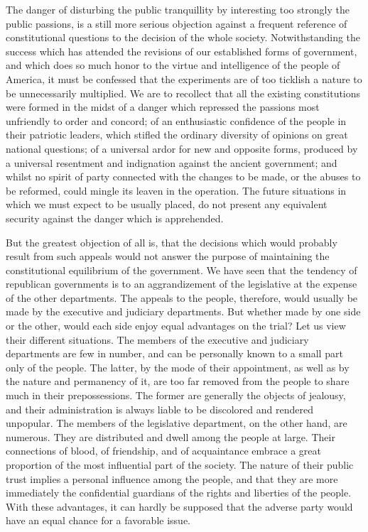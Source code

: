 The danger of disturbing the public tranquillity by interesting too strongly the public passions, is a still more serious objection against a frequent reference of constitutional questions to the decision of the whole society. 
Notwithstanding the success which has attended the revisions of our established forms of government, and which does so much honor to the virtue and intelligence of the people of America, it must be confessed that the experiments are of too ticklish a nature to be unnecessarily multiplied. 
We are to recollect that all the existing constitutions were formed in the midst of a danger which repressed the passions most unfriendly to order and concord; of an enthusiastic confidence of the people in their patriotic leaders, which stifled the ordinary diversity of opinions on great national questions; of a universal ardor for new and opposite forms, produced by a universal resentment and indignation against the ancient government; and whilst no spirit of party connected with the changes to be made, or the abuses to be reformed, could mingle its leaven in the operation. 
The future situations in which we must expect to be usually placed, do not present any equivalent security against the danger which is apprehended.

But the greatest objection of all is, that the decisions which would probably result from such appeals would not answer the purpose of maintaining the constitutional equilibrium of the government. 
We have seen that the tendency of republican governments is to an aggrandizement of the legislative at the expense of the other departments. 
The appeals to the people, therefore, would usually be made by the executive and judiciary departments. 
But whether made by one side or the other, would each side enjoy equal advantages on the trial? 
Let us view their different situations. 
The members of the executive and judiciary departments are few in number, and can be personally known to a small part only of the people. 
The latter, by the mode of their appointment, as well as by the nature and permanency of it, are too far removed from the people to share much in their prepossessions. 
The former are generally the objects of jealousy, and their administration is always liable to be discolored and rendered unpopular. 
The members of the legislative department, on the other hand, are numerous. 
They are distributed and dwell among the people at large. 
Their connections of blood, of friendship, and of acquaintance embrace a great proportion of the most influential part of the society. 
The nature of their public trust implies a personal influence among the people, and that they are more immediately the confidential guardians of the rights and liberties of the people. 
With these advantages, it can hardly be supposed that the adverse party would have an equal chance for a favorable issue.

